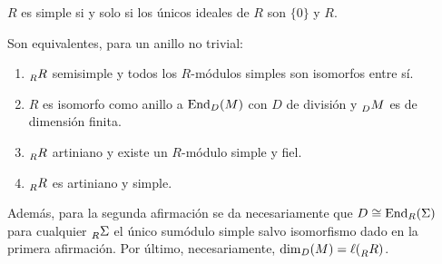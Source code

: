 \begin{df}
  \(R\) es simple si y solo si los únicos ideales de \(R\) son \(\{0\}\)
  y \(R\).
\end{df}

\begin{teo}
  Son equivalentes, para un anillo no trivial:
  \begin{enumerate}
    \item \(\prescript{}{R}{R}\) semisimple y todos los \(R\)-módulos
      simples son isomorfos entre sí.
    \item \(R\) es isomorfo como anillo a \(\operatorname{End}_D(M)\) con \(D\) de división
      y \(\prescript{}{D}{M}\) es de dimensión finita.
    \item \(\prescript{}{R}{R}\) artiniano y existe un \(R\)-módulo simple
      y fiel.
    \item \(\prescript{}{R}{R}\) es artiniano y simple.
  \end{enumerate}

  Además, para la segunda afirmación se da necesariamente que
  \(D\cong\operatorname{End}_R(\Sigma)\) para cualquier \(\prescript{}{R}{\Sigma}\)
  el único sumódulo simple salvo isomorfismo dado en la primera afirmación.
  Por último, necesariamente, \(\dim_D(M)=\ell(\prescript{}{R}{R})\).
\end{teo}
